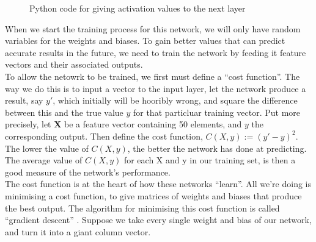 \begin{figure}[h]
    
    \caption{Python code for giving activation values to the next layer}
    \label{pyActVals}
\end{figure}

When we start the training process for this network, we will only have random variables for the weights and biases. To gain better values that can predict accurate results in the future,
we need to train the network by feeding it feature vectors and their associated outputs. \\

To allow the netowrk to be trained, we first must define a ``cost function''. The way we do this is to input a vector to the input layer, let the network produce a result, say $y'$, which
initially will be hooribly wrong, and square the difference between this and the true value $y$ for that particluar training vector. Put more precisely,
let \textbf{X} be a feature vector containing 50 elements, and $y$ the corresponding output. Then define the cost function, $C(X,y) := (y'-y)^2$. The lower the value of $C(X,y)$, the 
better the network has done at predicting. The average value of $C(X,y)$ for each X and y in our training set, is then a good measure of the network's performance. \\

The cost function is at the heart of how these networks ``learn''. All we're doing is minimising a cost function, to give matrices of weights and biases that
produce the best output. The algorithm for minimising this cost function is called ``gradient descent'' \cite{cauchy}. Suppose we take every single weight and bias of our network,
and turn it into a giant column vector. 